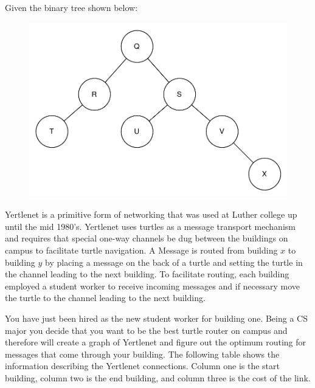 \documentclass[11pt]{exam}
\begin{document}
\begin{questions}
\newpage
\question Given the binary tree shown below:
\begin{figure}[h!]
    \begin{center}
        \includegraphics[height=3in]{binaryTree}
    \end{center}
\end{figure}

\newpage
\question
Yertlenet is a primitive form of networking that was used at Luther college up until the mid 1980's.  Yertlenet uses turtles as a message transport mechanism and requires that special one-way channels be dug between the buildings on campus to facilitate turtle navigation. A Message is routed from building $x$ to building $y$ by placing a message on the back of a turtle and setting the turtle in the channel leading to the next building.  To facilitate routing, each building employed a student worker to receive incoming messages and if necessary move the turtle to the channel leading to the next building.  

You have just been hired as the new student worker for building one. Being a CS major you decide that you want to be the best turtle router on campus and therefore will create a graph of Yertlenet and figure out the optimum routing for messages that come through your building. The following table shows the information describing the Yertlenet connections. Column one is the start building, column two is the end building, and column three is the cost of the link.


\end{questions}
\end{document}
